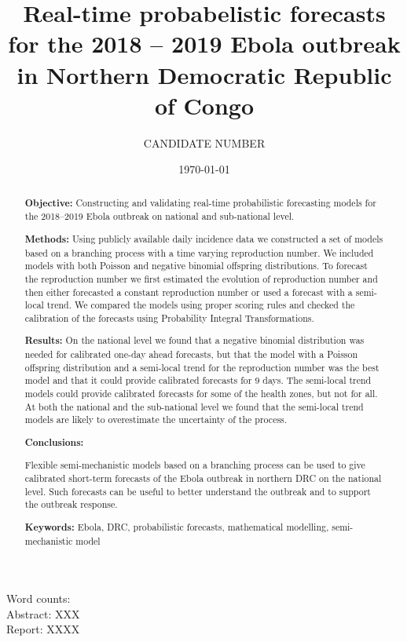 \documentclass[12pt]{article}
\title{Real-time probabelistic forecasts for the 2018 -- 2019 Ebola outbreak in Northern Democratic Republic of Congo}
\author{
  CANDIDATE NUMBER
}
\date{\today}
\begin{document}
\maketitle


Word counts:\\
Abstract: XXX\\
Report: XXXX

\begin{abstract}
  {\bf Objective:} Constructing and validating real-time probabilistic forecasting models for the 2018--2019 Ebola outbreak on national and sub-national level.
  
  \medskip
  
  {\bf Methods:} Using publicly available daily incidence data we constructed a set of models based on a branching process with a time varying reproduction number. We included models with both Poisson and negative binomial offspring distributions. To forecast the reproduction number we first estimated the evolution of reproduction number and then either forecasted a constant reproduction number or used a forecast with a semi-local trend. We compared the models using proper scoring rules and checked the calibration of the forecasts using Probability Integral Transformations. 

  \medksip
  
  {\bf Results:} On the national level we found that a negative binomial distribution was needed for calibrated one-day ahead forecasts, but that the model with a Poisson offspring distribution and a semi-local trend for the reproduction number was the best model and that it could provide calibrated forecasts for 9 days. The semi-local trend models could provide calibrated forecasts for some of the health zones, but not for all. At both the national and the sub-national level we found that the semi-local trend models are likely to overestimate the uncertainty of the process. 

  \medksip
  
  {\bf Conclusions:}

  Flexible semi-mechanistic models based on a branching process can be used to give calibrated short-term forecasts of the Ebola outbreak in northern DRC on the national level. Such forecasts can be useful to better understand the outbreak and to support the outbreak response. 

  \medksip

  {\bf Keywords:} Ebola, DRC, probabilistic forecasts, mathematical modelling, semi-mechanistic model

\end{abstract}
\end{document}
